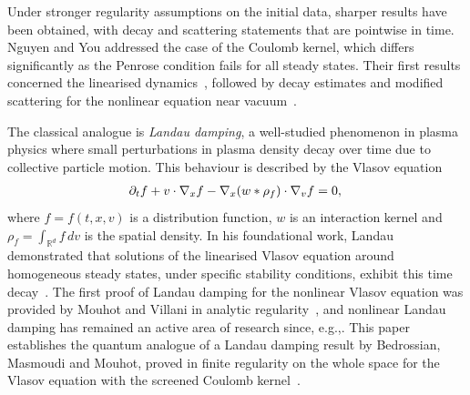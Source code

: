 \documentclass[11pt]{article}
\newcommand{\eg}{e.g.,\xspace}
\theoremstyle{plain}
\theoremstyle{remark}
\newcommand{\p}{\partial}
\newcommand{\R}{\mathbb{R}}
\begin{document}
Under stronger regularity assumptions on the initial data, sharper results have been obtained, with decay and scattering statements that are pointwise in time. Nguyen and You addressed the case of the Coulomb kernel, which differs significantly as the Penrose condition fails for all steady states. Their first results concerned the linearised dynamics~\cite{NguyenYou2023}, followed by decay estimates and modified scattering for the nonlinear equation near vacuum~\cite{NguyenYou2024}.

The classical analogue is \textit{Landau damping}, a well-studied phenomenon in plasma physics where small perturbations in plasma density decay over time due to collective particle motion. This behaviour is described by the Vlasov equation
\begin{align}\label{VP}
\p_tf+v\cdot\nabla_xf-\nabla_x(w*\rho_f)\cdot\nabla_vf=0,\vphantom{2_B}
\end{align}where $f=f(t,x,v)$ is a distribution function, $w$ is an interaction kernel and $\rho_f=\int_{\R^d} f\,dv$ is the spatial density. In his foundational work, Landau demonstrated that solutions of the linearised Vlasov equation around homogeneous steady states, under specific stability conditions, exhibit this time decay~\cite{Landaupaper1946}. The first proof of Landau damping for the nonlinear Vlasov equation was provided by Mouhot and Villani in analytic regularity~\cite{mou-vil-2011}, and nonlinear Landau damping has remained an active area of research since, \eg \cite{bed-mas-mou-2016,BedrossianMasmoudiMouhot2018,GrenierNguyenRodnianski2021,BedrossianMasmoudiMouhot2022,IonescuPausaderWangWidmayer2024Poisson}. This paper establishes the quantum analogue of a Landau damping result by Bedrossian, Masmoudi and Mouhot, proved in finite regularity on the whole space for the Vlasov equation with the screened Coulomb kernel~\cite{BedrossianMasmoudiMouhot2018}.
\end{document}
